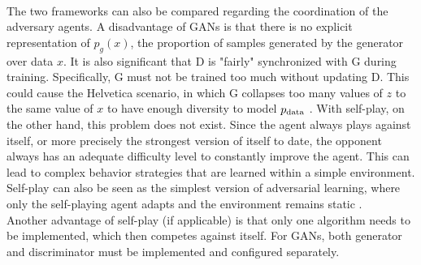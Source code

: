 \\
The two frameworks can also be compared regarding the coordination of the adversary agents. A disadvantage of GANs is that there is no explicit representation of $p_g (x)$, the proportion of samples generated by the generator over data $x$. It is also significant that D is "fairly" synchronized with G during training.
Specifically, G must not be trained too much without updating D. This could cause the Helvetica scenario, in which G collapses too many values of $z$ to the same value of $x$ to have enough diversity to model $p\textsubscript{data}$ \cite{gansgoodfellow2014generative}.
With self-play, on the other hand, this problem does not exist. Since the agent always plays against itself, or more precisely the strongest version of itself to date, the opponent always has an adequate difficulty level to constantly improve the agent. This can lead to complex behavior strategies that are learned within a simple environment. Self-play can also be seen as the simplest version of adversarial learning, where only the self-playing agent adapts and the environment remains static \cite{gabor19}.
\\
Another advantage of self-play (if applicable) is that only one algorithm needs to be implemented, which then competes against itself. For GANs, both generator and discriminator must be implemented and configured separately.